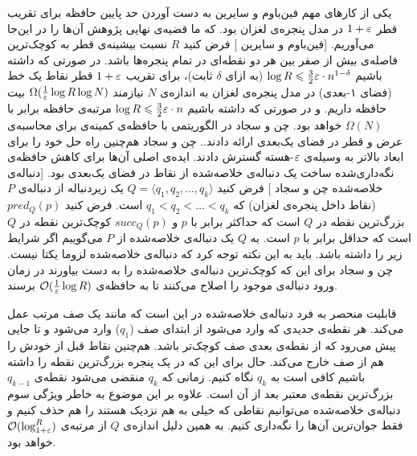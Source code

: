 یکی از کارهای مهم فین‌باوم و سایرین به دست آوردن حد پایین حافظه برای تقریب قطر $1+\varepsilon$ در مدل پنجره‌ی لغزان بود. که ما قضیه‌ی نهایی پژوهش آن‌ها را در این‌جا می‌آوریم.
[فین‌باوم و سایرین ]
فرض کنید $R$ نسبت بیشینه‌ی قطر به کوچک‌ترین فاصله‌ی بیش از صفر بین هر دو نقطه‌ای در تمام پنجره‌ها باشد. در صورتی که داشته باشیم
$\log R \leqslant \frac{3}{2} \varepsilon \cdot n^{1-\delta}$
(به ازای $\delta$ ثابت)،
برای تقریب $1+\varepsilon$ قطر نقاط یک خط (فضای ۱-بعدی) در مدل پنجره‌ی لغزان به اندازه‌ی $N$ نیازمند
$\Omega(\frac{1}{\varepsilon} \log R \log N)$
بیت حافظه داریم. و در صورتی که داشته باشیم
$\log R \leqslant \frac{3}{2} \varepsilon \cdot n$
مرتبه‌ی حافظه برابر با
$\Omega(N)$
خواهد بود.
چن و سجاد در
الگوریتمی با حافظه‌ی کمینه‌ی  برای محاسبه‌ی عرض و قطر در فضای یک‌بعدی ارائه دادند.. چن و سجاد هم‌چنین راه حل خود را برای ابعاد بالاتر به وسیله‌ی $\varepsilon$-هسته گسترش دادند. ایده‌‌ی اصلی آن‌ها برای کاهش حافظه‌ی نگه‌داری‌شده ساخت یک دنباله‌ی خلاصه‌شده  از نقاط در فضای یک‌بعدی بود.
[دنباله‌ی خلاصه‌شده چن و سجاد ]
فرض کنید 
$Q = \langle q_1, q_2, \ldots , q_k \rangle$
یک زیردنباله از دنباله‌ی $P$ (نقاط داخل پنجره‌ی لغزان)  که
$q_1 < q_2 < \ldots < q_k$
است. فرض کنید 
$pred_Q(p)$
بزرگ‌ترین نقطه در $Q$ است که حداکثر برابر با $p$ و $succ_Q(p)$ کوچک‌ترین نقطه در $Q$ است که حداقل برابر با $p$ است. به $Q$ یک دنباله‌ی خلاصه‌شده از $P$ می‌گوییم اگر شرایط زیر را داشته باشد.
باید به این نکته توجه کرد که دنباله‌ی خلاصه‌شده لزوما یکتا نیست. چن و سجاد برای این که کوچک‌ترین دنباله‌ی خلاصه‌شده را به دست بیاورند در زمان ورود دنباله‌ی موجود را اصلاح می‌کنند تا به حافظه‌ی
$\mathcal{O}(\frac{1}{\varepsilon} \log R)$
برسند.

قابلیت منحصر به فرد دنباله‌ی خلاصه‌شده در این است که مانند یک صف  مرتب عمل می‌کند. هر نقطه‌ی جدیدی که وارد می‌شود از ابتدای صف ($q_1$) وارد می‌شود و تا جایی پیش می‌رود که از نقطه‌ی بعدی صف کوچک‌تر باشد. هم‌چنین نقاط قبل از خودش را هم از صف خارج می‌کند. حال برای این که در یک پنجره بزرگ‌ترین نقطه را داشته باشیم کافی است به $q_k$ نگاه کنیم. زمانی که $q_k$ منقضی می‌شود نقطه‌ی $q_{k-1}$ بزرگ‌ترین نقطه‌ی معتبر بعد از آن است. علاوه بر این موضوع به خاطر ویژگی سوم دنباله‌ی خلاصه‌شده می‌توانیم نقاطی که خیلی به هم نزدیک هستند را هم حذف کنیم و فقط جوان‌ترین آن‌ها را نگه‌داری کنیم. به همین دلیل اندازه‌ی $Q$ از مرتبه‌ی 
$\mathcal{O}(\log_{1+\varepsilon}^{R})$
خواهد بود.

